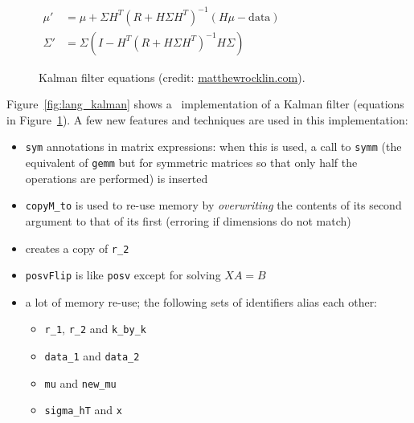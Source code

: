 \begin{figure}[t]
    {\centering
    $ \displaystyle
    \begin{aligned}
        \mu' &= \mu + \Sigma H^T (R + H \Sigma H^T)^{-1} (H \mu - \textrm{data})\\
        \Sigma' &= \Sigma ( I - H^T (R + H \Sigma H^T)^{-1} H \Sigma )
    \end{aligned}
    $ \par}
    \caption{Kalman filter equations (credit:
    \href{http://matthewrocklin.com/blog/work/2012/11/24/Kalman-Filter}{matthewrocklin.com}).}\label{fig:kalman_eqns}
\end{figure}

Figure~\ref{fig:lang_kalman} shows a \lang\ implementation of a Kalman filter
(equations in Figure~\ref{fig:kalman_eqns}). A few new features and techniques
are used in this implementation:
\begin{itemize}

    \item \texttt{sym} annotations in matrix expressions: when this is used, a
        call to \texttt{symm} (the equivalent of \texttt{gemm} but for
        symmetric matrices so that only half the operations are performed) is
        inserted

    \item \texttt{copyM\_to} is used to re-use memory by \emph{overwriting} the
        contents of its second argument to that of its first (erroring if
        dimensions do not match)

    \item {} creates a copy of \texttt{r\_2}

    \item \texttt{posvFlip} is like \texttt{posv} except for solving $XA = B$

    \item a lot of memory re-use; the following sets of identifiers alias each other:
        \begin{itemize}
            \item \texttt{r\_1}, \texttt{r\_2} and \texttt{k\_by\_k}
            \item \texttt{data\_1} and \texttt{data\_2}
            \item \texttt{mu} and \texttt{new\_mu}
            \item \texttt{sigma\_hT} and \texttt{x}
        \end{itemize}

\end{itemize}

